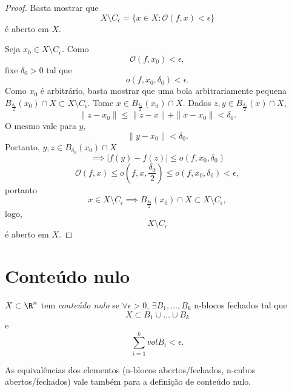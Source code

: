 \begin{proof}
    Basta mostrar que \[
    X \setminus C_{\epsilon} = \{x\in X : \mathcal{O}\left( f, x \right) <\epsilon\} 
    \] é aberto em $X$.

    Seja $x_0\in X\setminus C_{\epsilon}$. Como \[
	\mathcal{O}\left( f,x_0 \right) <\epsilon
    ,\] fixe $\delta_0 > 0$ tal que \[
    o\left( f, x_0, \delta_0 \right) < \epsilon
    .\] Como $x_0$ é arbitrário, basta mostrar que uma bola arbitrariamente pequena $B_{\frac{\delta_0}{2}}\left( x_0 \right) \cap X \subset X\setminus C_\epsilon$. Tome $x\in B_{\frac{\delta_0}{2}}\left( x_0 \right) \cap X$. Dados $z,y \in B_{\frac{\delta_0}{2}}\left( x \right) \cap X$, \[
    \|z-x_0\| \le \|z-x\|+\|x-x_0\| < \delta_0
    .\] O mesmo vale para $y$, \[
    \|y-x_0\| < \delta_0
    .\] Portanto, $y,z \in  B_{\delta_0}\left( x_0 \right) \cap X$ \[
    \implies \left| f\left( y \right) -f\left( z \right)  \right| \le o\left( f, x_0, \delta_0 \right) 
    \] \[
    \mathcal{O}\left( f,x \right) \le o \left(  f, x, \frac{\delta_0}{2}\right) \le o\left(  f, x_0,\delta_0\right)  < \epsilon
    ,\] portanto \[
    x\in X\setminus C_\epsilon \implies B_{\frac{\delta_0}{2}}\left( x_0 \right) \cap X \subset X\setminus C_{\epsilon}
    ,\] logo,  \[
    X \setminus C_{\epsilon}
    \]  é aberto em $X$.
\end{proof}

\section*{Conteúdo nulo}

\begin{definition}
    $X\subset \R^{n}$ tem \emph{conteúdo nulo} se $\forall \epsilon>0$, $\exists B_1,\ldots, B_k$ n-blocos fechados tal que \[
    X\subset B_1\cup \ldots\cup B_k
    \] e \[
    \sum_{i=1}^{k} vol B_i < \epsilon
    .\] 
\end{definition}

\begin{note}
    As equivalências dos elementos (n-blocos abertos/fechados, n-cubos abertos/fechados) vale também para a definição de conteúdo nulo.
\end{note}

